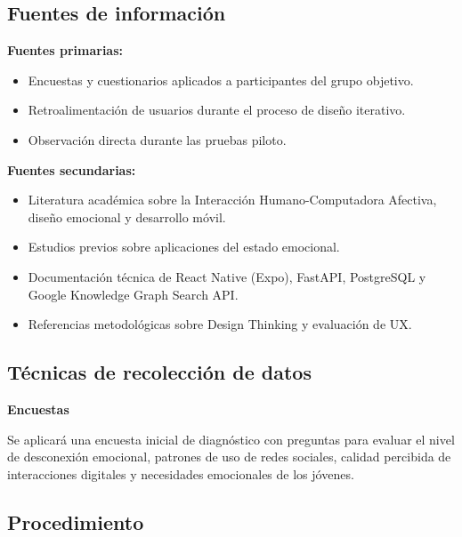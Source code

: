 \subsection{Fuentes de información}

\noindent\textbf{Fuentes primarias:}

\begin{itemize}[noitemsep, topsep=4pt, leftmargin=*]
    \item Encuestas y cuestionarios aplicados a participantes del grupo objetivo.
    \item Retroalimentación de usuarios durante el proceso de diseño iterativo.
    \item Observación directa durante las pruebas piloto.
\end{itemize}

\noindent\textbf{Fuentes secundarias:}

\begin{itemize}[noitemsep, topsep=4pt, leftmargin=*]
    \item Literatura académica sobre la Interacción Humano-Computadora Afectiva, diseño emocional y desarrollo móvil.
    \item Estudios previos sobre aplicaciones del estado emocional.
    \item Documentación técnica de React Native (Expo), FastAPI, PostgreSQL y Google Knowledge Graph Search API.
    \item Referencias metodológicas sobre Design Thinking y evaluación de UX.
\end{itemize}

\subsection{Técnicas de recolección de datos}

\noindent\textbf{Encuestas}

\noindent Se aplicará una encuesta inicial de diagnóstico con preguntas para evaluar el nivel de desconexión emocional, patrones de uso de redes sociales, calidad percibida de interacciones digitales y necesidades emocionales de los jóvenes.

\subsection{Procedimiento}

